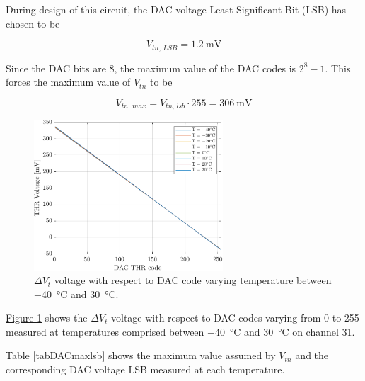\par
During design of this circuit, the DAC voltage Least Significant Bit (LSB) has chosen to be \cite{sonzogni_2021_design}

\begin{equation}
    V_{\textit{tn, LSB}} = \SI{1.2}{\milli\volt}
\end{equation}

\noindent
Since the DAC bits are 8, the maximum value of the DAC codes is $2^{8}-1$. This forces the maximum value of $V_{\textit{tn}}$ to be

\begin{equation}
    V_{\textit{tn, max}} = V_{\textit{tn, lsb}} \cdot 255 = \SI{306}{\milli\volt}
\end{equation}

\begin{figure}[ht]
    \centering 
    \includegraphics[width=0.63\textwidth]{Images/chap1/results/DAC_thr/DAC_thr_voltage_TEMP.pdf}
    \caption{$\Delta V_{\textit{t}}$ voltage with respect to DAC code varying temperature between \SI{-40}{\celsius} and \SI{30}{\celsius}.}
    \label{figDACthrtemp}
\end{figure}

\noindent
\hyperref[figDACthrtemp]{Figure \ref{figDACthrtemp}} shows the $\Delta V_{\textit{t}}$ voltage with respect to DAC codes varying from 0 to 255 measured at temperatures comprised between \SI{-40}{\celsius} and \SI{30}{\celsius} on channel 31. 

\hyperref[tabDACmaxlsb]{Table \ref{tabDACmaxlsb}} shows the maximum value assumed by $V_{\textit{tn}}$ and the corresponding DAC voltage LSB measured at each temperature.


